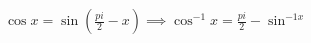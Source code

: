 \documentclass[preview]{standalone}
\begin{document}
\begin{align*}
\cos x = \sin (\frac{pi}{2} - x) \implies              \cos^{-1} x = \frac{pi}{2} - \sin^{-1 x}
\end{align*}
\end{document}
